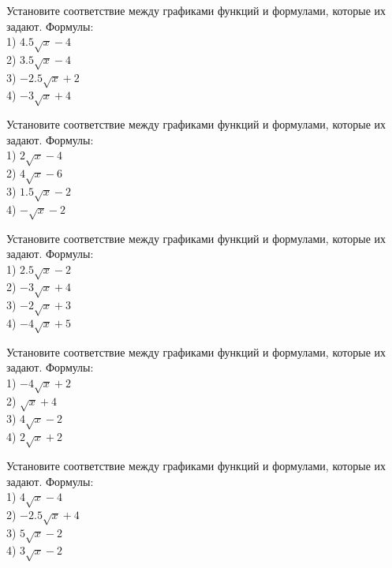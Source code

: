 \documentclass[4apaper]{article}
\begin{document}
\begin{taskBN}{56}
Установите соответствие между графиками функций и формулами, которые их задают. Формулы: \\1) $4.5\sqrt{x}-4$\\2) $3.5\sqrt{x}-4$\\3) $-2.5\sqrt{x}+2$\\4) $-3\sqrt{x}+4$
\end{taskBN}

\begin{taskBN}{57}
Установите соответствие между графиками функций и формулами, которые их задают. Формулы: \\1) $2\sqrt{x}-4$\\2) $4\sqrt{x}-6$\\3) $1.5\sqrt{x}-2$\\4) $-\sqrt{x}-2$
\end{taskBN}

\begin{taskBN}{58}
Установите соответствие между графиками функций и формулами, которые их задают. Формулы: \\1) $2.5\sqrt{x}-2$\\2) $-3\sqrt{x}+4$\\3) $-2\sqrt{x}+3$\\4) $-4\sqrt{x}+5$
\end{taskBN}

\begin{taskBN}{59}
Установите соответствие между графиками функций и формулами, которые их задают. Формулы: \\1) $-4\sqrt{x}+2$\\2) $\sqrt{x}+4$\\3) $4\sqrt{x}-2$\\4) $2\sqrt{x}+2$
\end{taskBN}

\begin{taskBN}{60}
Установите соответствие между графиками функций и формулами, которые их задают. Формулы: \\1) $4\sqrt{x}-4$\\2) $-2.5\sqrt{x}+4$\\3) $5\sqrt{x}-2$\\4) $3\sqrt{x}-2$
\end{taskBN}
\end{document}

